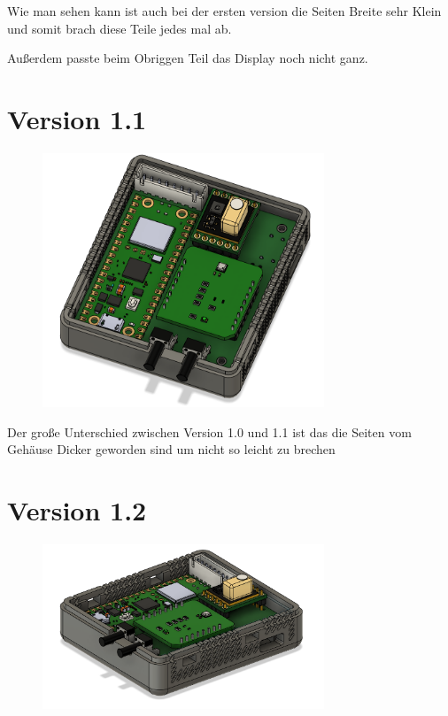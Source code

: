 \begin{inhalt}
Wie man sehen kann ist auch bei der ersten version die Seiten Breite sehr Klein und somit brach diese Teile jedes mal ab. 

Außerdem passte beim Obriggen Teil das Display noch nicht ganz.

\newpage

\section{Version 1.1}

\begin{figure}[!htb]
\centering
\includegraphics[width=0.75\textwidth]{files/Thomas/pics/geheause/1.1/gehaeuse_top.png}
\caption[Bildbezeichnung für Abbildungsverzeichnis]{}
\label{fig:gehaeuse_internet_bild}
\end{figure}

Der große Unterschied zwischen Version 1.0 und 1.1 ist das die Seiten vom Gehäuse Dicker geworden sind um nicht so leicht zu brechen

\section{Version 1.2}

\begin{figure}[!htb]
\centering
\includegraphics[width=0.75\textwidth]{files/Thomas/pics/geheause/1.2/gehaeuse_side.png}
\caption[Bildbezeichnung für Abbildungsverzeichnis]{}
\label{fig:gehaeuse_internet_bild}
\end{figure}


\end{inhalt}
